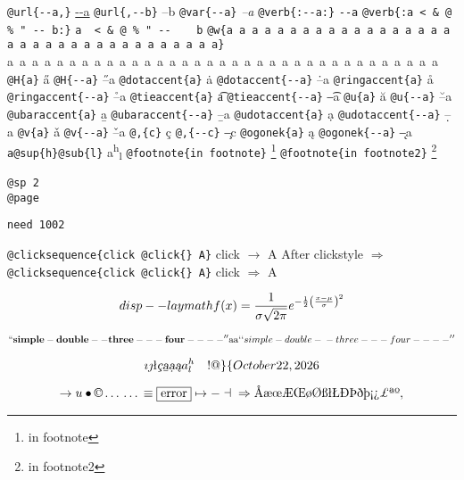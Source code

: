 \documentclass{book}
\newcommand\GNUTexinfocommandstyletextvar[1]{{\normalfont{}\textsl{#1}}}%
\begin{document}
\texttt{@url\{{-}{-}a,\}} \url{--a}
\texttt{@url\{,{-}{-}b\}} --b
\texttt{@var\{{-}{-}a\}} \GNUTexinfocommandstyletextvar{--a}
\texttt{@verb\{:{-}{-}a:\}} \verb:--a:
\texttt{@verb\{:a  < \& @ \% " {-}{-}    b:\}} \verb:a  < & @ % " --    b:
\texttt{@w\{a a a a a a a a a a a a a a a a a a a a a a a a a a a a a a a a a a a\}} \hbox{a a a a a a a a a a a a a a a a a a a a a a a a a a a a a a a a a a a}
\texttt{@H\{a\}} \H{a}
\texttt{@H\{{-}{-}a\}} \H{--a}
\texttt{@dotaccent\{a\}} \.{a}
\texttt{@dotaccent\{{-}{-}a\}} \.{--a}
\texttt{@ringaccent\{a\}} \r{a}
\texttt{@ringaccent\{{-}{-}a\}} \r{--a}
\texttt{@tieaccent\{a\}} \t{a}
\texttt{@tieaccent\{{-}{-}a\}} \t{--a}
\texttt{@u\{a\}} \u{a}
\texttt{@u\{{-}{-}a\}} \u{--a}
\texttt{@ubaraccent\{a\}} \b{a}
\texttt{@ubaraccent\{{-}{-}a\}} \b{--a}
\texttt{@udotaccent\{a\}} \d{a}
\texttt{@udotaccent\{{-}{-}a\}} \d{--a}
\texttt{@v\{a\}} \v{a}
\texttt{@v\{{-}{-}a\}} \v{--a}
\texttt{@,\{c\}} \c{c}
\texttt{@,\{{-}{-}c\}} \c{--c}
\texttt{@ogonek\{a\}} \k{a}
\texttt{@ogonek\{{-}{-}a\}} \k{--a}
\texttt{a@sup\{h\}@sub\{l\}} a\textsuperscript{h}\textsubscript{l}
\texttt{@footnote\{in footnote\}} \footnote{in footnote}
\texttt{@footnote\{in footnote2\}} \footnote{in footnote2}

\texttt{@sp 2}\leavevmode{}\\
\baselineskip %
\texttt{@page}\leavevmode{}\\
\newpage{}%
\phantom{blabla}%

\texttt{need 1002}
\needspace{1.002pt}%

\texttt{@clicksequence\{click @click\{\} A\}} click $\rightarrow{}$ A
After clickstyle $\Rightarrow{}$
\texttt{@clicksequence\{click @click\{\} A\}} click $\Rightarrow{}$ A


$$
disp--laymath
f(x) = {1 \over \sigma \sqrt{2\pi}}e^{-{1 \over 2}\left({x-\mu \over \sigma}\right)^2}
$$

$$
\mathbf{``simple-double--three---four----''} \hbox{aa}
`\hbox{}`simple-double-\hbox{}-three---four----'\hbox{}'
$$

$$
\imath{} \jmath{}
\mathord{\text{\l{}}} \textsl{\c{c}}
\textsl{\b{a}} \textsl{\d{a}} \textsl{\k{a}} a^{h}_{l}
 \ {}\ {} \ {}\-{}  ! @ \} \{ 
\today{}
$$

$$
\rightarrow{}
u
\bullet{} \copyright{} \dots{} \dots{} \equiv{}
\fbox{error} \mapsto{} - \dashv{} \Rightarrow{}
\mathord{\text{\AA{}}} \mathord{\text{\ae{}}} \mathord{\text{\oe{}}} \mathord{\text{\AE{}}} \mathord{\text{\OE{}}} \mathord{\text{\o{}}} \mathord{\text{\O{}}} \mathord{\text{\ss{}}} \mathord{\text{\l{}}} \mathord{\text{\L{}}} \mathord{\text{\DH{}}}
\mathord{\text{\TH{}}} \mathord{\text{\dh{}}} \mathord{\text{\th{}}} \mathord{\text{\textexclamdown{}}} \mathord{\text{\textquestiondown{}}} \mathsterling{}
\mathord{\text{\textordfeminine{}}} \mathord{\text{\textordmasculine{}}} , 
$$
\end{document}
